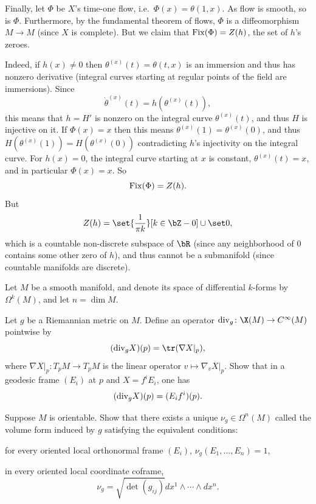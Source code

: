     Finally, let $\Phi$ be $X$'s time-one flow, i.e.\ $\Phi(x)=\theta(1,x)$.
    As flow is smooth, so is $\Phi$.
    Furthermore, by the fundamental theorem of flows, $\Phi$ is a diffeomorphism $M\to M$ (since $X$ is complete).
    But we claim that ${\rm Fix}(\Phi)=Z(h)$, the set of $h$'s zeroes.

    Indeed, if $h(x)\neq0$ then $\theta^{(x)}(t)=\theta(t,x)$ is an immersion and thus has nonzero derivative (integral curves starting at regular points of the field are immersions).
    Since
    $$ \dot\theta^{(x)}(t) = h(\theta^{(x)}(t)) , $$
    this means that $h=H'$ is nonzero on the integral curve $\theta^{(x)}(t)$, and thus $H$ is injective on it.
    If $\Phi(x)=x$ then this means $\theta^{(x)}(1)=\theta^{(x)}(0)$, and thus $H(\theta^{(x)}(1))=H(\theta^{(x)}(0))$ contradicting $h$'s injectivity on the integral curve.
    For $h(x)=0$, the integral curve starting at $x$ is constant, $\theta^{(x)}(t)=x$, and in particular $\Phi(x)=x$.
    So
    $$ {\rm Fix}(\Phi) = Z(h) . $$
    But
    $$ Z(h) = \set{\frac1{\pi k}}[k\in\bZ-0]\cup\set0 , $$
    which is a countable non-discrete subspace of $\bR$ (since any neighborhood of $0$ contains some other zero of $h$), and thus cannot be a submanifold (since countable manifolds are discrete).
\eenum

\def\div{{\rm div}}
\bprob

    Let $M$ be a smooth manifold, and denote its space of differential $k$-forms by $\Omega^k(M)$, and let $n=\dim M$.
    \benum
        \item Let $g$ be a Riemannian metric on $M$.
        Define an operator $\div_g\colon\X(M)\to C^\infty(M)$ pointwise by
        $$ (\div_gX)(p) = \tr(\nabla X|_p) , $$
        where $\nabla X|_p\colon T_pM\to T_pM$ is the linear operator $v\mapsto\nabla_vX|_p$.
        Show that in a geodesic frame $(E_i)$ at $p$ and $X=f^iE_i$, one has
        $$ (\div_gX)(p) = (E_if^i)(p) . $$

        \item Suppose $M$ is orientable.
        Show that there exists a unique $\nu_g\in\Omega^n(M)$ called the {\emphcolor volume form} induced by $g$ satisfying the equivalent conditions:
        \benum
            \item for every oriented local orthonormal frame $(E_i)$, $\nu_g(E_1,\dots,E_n)=1$,
            \item in every oriented local coordinate coframe,
            $$ \nu_g = \sqrt{\det(g_{ij})}dx^1\wedge\cdots\wedge dx^n . $$
        \eenum

